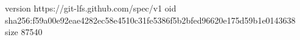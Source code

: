 version https://git-lfs.github.com/spec/v1
oid sha256:f59a00e92eae4282ec58e4510c31fe5386f5b2bfed96620e175d59b1e0143638
size 87540
